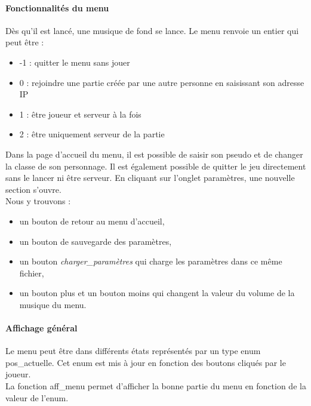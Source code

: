 \documentclass[11pt]{article}
\begin{document}
                \paragraph{Fonctionnalités du menu}
                Dès qu’il est lancé, une musique de fond se lance. Le menu renvoie un entier qui peut être :
                \begin{itemize}
                    \item-1 : quitter le menu sans jouer
                    \item 0 : rejoindre une partie créée par une autre personne en saisissant son adresse IP
                    \item 1 : être joueur et serveur à la fois
                    \item 2 : être uniquement serveur de la partie
                \end{itemize}
                Dans la page d’accueil du menu, il est possible de saisir son pseudo et de changer la classe de son personnage. Il est également possible de quitter le jeu directement sans le lancer ni être serveur. En cliquant sur l’onglet paramètres, une nouvelle section s’ouvre.\\ 
                Nous y trouvons : 
                \begin{itemize}
                    \item un bouton de retour au menu d’accueil,
                    \item un bouton de sauvegarde des paramètres,
                    \item un bouton \textit{charger\_paramètres} qui charge les paramètres dans ce même fichier,
                    \item un bouton plus et un bouton moins qui changent la valeur du volume de la musique du menu.
                \end{itemize}
   
                \paragraph{Affichage général}\leavevmode\newline
                Le menu peut être dans différents états représentés par un type enum pos\_actuelle. Cet enum est mis à jour en fonction des boutons cliqués par le joueur.  \\
                La fonction aff\_menu permet d’afficher la bonne partie du menu en fonction de la valeur de l’enum. 
                                
\end{document}
